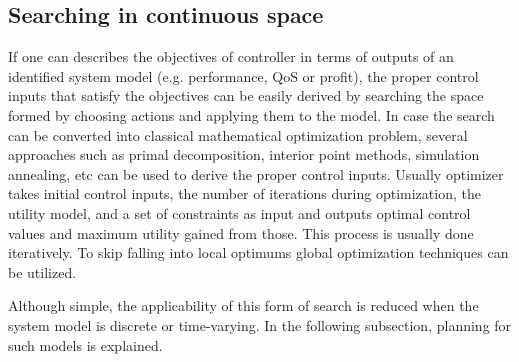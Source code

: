 \subsection{Searching in continuous space}
\label{sec:static-optimizer}
If one can describes the objectives of controller in terms of outputs of an identified system model (e.g. performance, QoS or profit), the proper control inputs that satisfy the objectives can be easily derived by searching the space formed by choosing actions and applying them to the model.
In case the search can be converted into classical mathematical optimization problem, several approaches such as primal decomposition, interior point methods, simulation annealing, etc can be used to derive the proper control inputs. 
Usually optimizer takes initial control inputs, the number of iterations during optimization, the utility model, and a set of constraints as input
and outputs optimal control values and maximum utility gained from those. This process is usually done iteratively.
To skip falling into local optimums global optimization techniques can be utilized. 

Although simple, the applicability of this form of search is reduced when the system model is discrete or time-varying. In the following subsection, planning for such models is explained. 

% 
% 	
% 
% 
% 
% 
% 
% 
% 
% 

